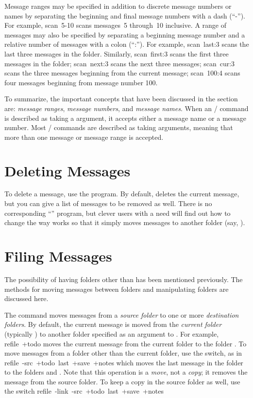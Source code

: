 Message ranges may be specified in addition to discrete message numbers
or names by separating the beginning
and final message numbers with a dash (``-'').
For example,
\example scan\ 5-10\endexample
scans messages~5 through~10 inclusive.
A range of messages may also be specified by separating a beginning
message number and a relative number of messages with
a colon (``:'').
For example,
\example scan\ last:3\endexample
scans the last three messages in the folder.
Similarly,
\example scan\ first:3\endexample
scans the first three messages in the folder;
\example scan\ next:3\endexample
scans the next three messages;
\example scan\ cur:3\endexample
scans the three messages beginning from the current message;
\example scan\ 100:4\endexample
scans four messages beginning from message number 100.

To summarize, the important concepts that have been discussed
in the section are:
{\it message ranges},
{\it message numbers},
and {\it message names}.
When an \MH/ command is described as taking a  argument,
it accepts either a message name or a message number.
Most \MH/ commands are described as taking  arguments,
meaning that more than one message or message range is accepted.

\section{Deleting Messages}
To delete a message, use the  program.
By default,  deletes the current message,
but you can give  a list of messages to be removed as well.
There is no corresponding ``'' program,
but clever users with a need will find out how to change the way 
works so that it simply moves messages to another folder
(say, ).

\section{Filing Messages}
The possibility of having folders other than  has been mentioned
previously.
The methods for moving messages between folders and manipulating folders
are discussed here.

The  command moves messages from a {\it source folder} to one or
more {\it destination folders}.
By default, the current message is moved from the {\it current folder} 
(typically ) to another folder specified as an
argument to .
For example,
\example refile\ +todo\endexample
moves the current message from the current folder to the folder .
To move messages from a folder other than the current folder,
use the  switch, as in
\example refile\ -src\ +todo\ last\ +save\ +notes\endexample
which moves the last message in the  folder to the folders
 and .
Note that this operation is a {\it move}, not a {\it copy};
it removes the message from the source folder.
To keep a copy in the source folder as well, use the  switch
\example refile\ -link\ -src\ +todo\ last\ +save\ +notes\endexample

